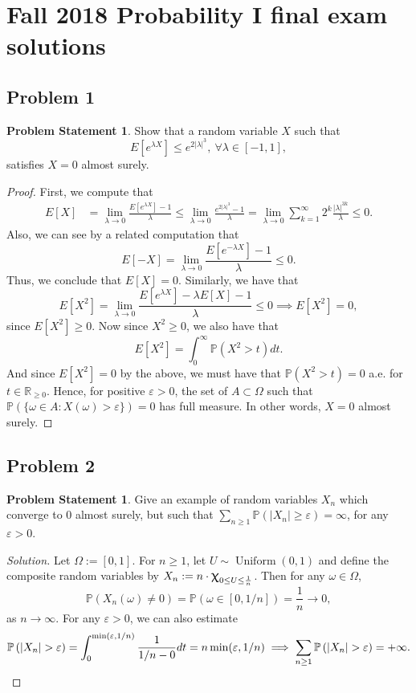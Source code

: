 \documentclass[12pt,reqno]{article}
\theoremstyle{plain}
\theoremstyle{definition}
\newtheorem{problem}[theorem]{Problem Statement}
\newcommand{\PP}[1]{\ensuremath{\mathbb{P}\left(#1\right)}}
\renewcommand{\chi}{\scalebox{1.25}{$\upchi$}}
\begin{document}
\newpage
\section{Fall 2018 Probability I final exam solutions} 

\subsection{Problem 1}

\begin{problem}
Show that a random variable $X$ such that 
\[
E[e^{\lambda X}] \leq e^{2|\lambda|^3},\ \forall \lambda \in [-1, 1], 
\]
satisfies $X = 0$ almost surely. 
\end{problem}
\begin{proof} 
First, we compute that 
\begin{align*} 
E[X] & = \lim_{\lambda \rightarrow 0} \frac{E[e^{\lambda X}] - 1}{\lambda} 
     \leq \lim_{\lambda \rightarrow 0} \frac{e^{2|\lambda|^3} - 1}{\lambda} 
     = \lim_{\lambda \rightarrow 0} \sum_{k=1}^{\infty} 
     2^k \frac{|\lambda|^{3k}}{\lambda} 
     \leq 0. 
\end{align*} 
Also, we can see by a related computation that 
\[
E[-X] = \lim_{\lambda \rightarrow 0} \frac{E[e^{-\lambda X}] - 1}{\lambda}
     \leq 0. 
\]
Thus, we conclude that $E[X] = 0$. 
Similarly, we have that 
\[
E[X^2] = \lim_{\lambda \rightarrow 0} \frac{E[e^{\lambda X}] - \lambda E[X] -1}{
     \lambda} \leq 0 \implies E[X^2] = 0, 
\]
since $E[X^2] \geq 0$. Now since $X^2 \geq 0$, we also have that 
\[
E[X^2] = \int_0^{\infty} \PP{X^2 > t} dt. 
\]
And since $E[X^2] = 0$ by the above, we must have that $\PP{X^2 > t} = 0$ a.e. 
for $t \in \mathbb{R}_{\geq 0}$. Hence, for positive $\varepsilon > 0$, 
the set of $A \subset \Omega$ such that 
$\PP{\{\omega \in A: X(\omega) > \varepsilon\}} = 0$ has full measure. 
In other words, $X = 0$ almost surely. 
\end{proof} 

\subsection{Problem 2}

\begin{problem}
Give an example of random variables $X_n$ which converge to $0$ almost 
surely, but such that $\sum_{n \geq 1} \PP{|X_n| \geq \varepsilon} = \infty$, 
for any $\varepsilon > 0$. 
\end{problem}
\begin{proof}[Solution] 
Let $\Omega := [0, 1]$. 
For $n \geq 1$, let $U \sim \operatorname{Uniform}(0,1)$ and 
define the composite random variables by 
$X_n := n \cdot \chi_{0 \leq U \leq \frac{1}{n}}$. Then for any 
$\omega \in \Omega$, 
\[
\PP{X_n(\omega) \neq 0} = \PP{\omega \in [0, 1/n]} = \frac{1}{n} 
     \longrightarrow 0, 
\]
as $n \rightarrow \infty$. For any $\varepsilon > 0$, we can also estimate 
\[
\PP{|X_n| > \varepsilon} = 
     \int_0^{\min(\varepsilon, 1/n)} \frac{1}{1/n-0} dt = 
     n \min(\varepsilon, 1/n) \implies 
     \sum_{n \geq 1} \PP{|X_n| > \varepsilon} = +\infty. 
     \qedhere
\]
\end{proof} 
\end{document}
